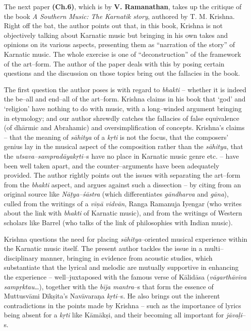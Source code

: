 The next paper \textbf{(Ch.6)}, which is by \textbf{V. Ramanathan}, takes up the critique of the book \textit{A Southern Music: The Karnatik story}, authored by T. M. Krishna. Right off the bat, the author points out that, in this book, Krishna is not objectively talking about Karnatic music but bringing in his own takes and opinions on its various aspects, presenting them as “narration of the story” of Karnatic music. The whole exercise is one of “deconstruction” of the framework of the art–form. The author of the paper deals with this by posing certain questions and the discussion on those topics bring out the fallacies in the book.

The first question the author poses is with regard to \textit{bhakti} – whether it is indeed the be–all and end–all of the art–form. Krishna claims in his book that ‘god’ and ‘religion’ have nothing to do with music, with a long–winded argument bringing in etymology; and our author shrewdly catches the fallacies of false equivalence (of dhārmic and Abrahamic) and oversimplification of concepts. Krishna’s claims – that the meaning of \textit{sāhitya} of a \textit{kṛti} is not the focus, that the composers’ genius lay in the musical aspect of the composition rather than the \textit{sāhitya}, that the \textit{utsava–sampradāya}\textit{kṛti}–s have no place in Karnatic music genre etc. – have been well taken apart, and the counter–arguments have been adequately provided. The author rightly points out the issues with separating the art–form from the \textit{bhakti} aspect, and argues against such a dissection – by citing from an original source like \textit{Nāṭya–śāstra} (which differentiates \textit{gāndharva} and \textit{gāna}), culled from the writings of a \textit{vīṇā vidvān}, Ranga Ramanuja Iyengar (who writes about the link with \textit{bhakti} of Karnatic music), and from the writings of Western scholars like Barrel (who talks of the link of philosophies with Indian music).

Krishna questions the need for placing \textit{sāhitya}–oriented musical experience within the Karnatic music itself. The present author tackles the issue in a multi–disciplinary manner, bringing in evidence from acoustic studies, which substantiate that the lyrical and melodic are mutually supportive in enhancing the experience – well–juxtaposed with the famous verse of Kālidāsa (\textit{vāgarthāviva sampṛktau}…), together with the \textit{bīja mantra}–s that form the essence of Muttusvāmi Dīkṣita’s Navāvaraṇa \textit{kṛti}–s. He also brings out the inherent contradictions in the points made by Krishna – such as the importance of lyrics being absent for a \textit{kṛti} like Kāmākṣi, and their becoming all important for \textit{jāvaḷi}–s.

